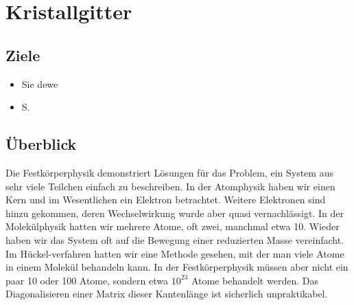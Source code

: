 
\chapter{Kristallgitter}





\section{Ziele}

\begin{itemize}
\item Sie dewe

\item S.

\end{itemize}





\section{Überblick}

Die Festkörperphysik demonstriert Lösungen für das Problem, ein System aus sehr viele Teilchen einfach zu beschreiben. In der Atomphysik haben wir einen Kern und im Wesentlichen ein Elektron betrachtet. Weitere Elektronen sind hinzu gekommen, deren Wechselwirkung wurde aber quasi vernachlässigt. In der Molekülphysik hatten wir mehrere Atome, oft zwei, manchmal etwa 10. Wieder haben wir das System oft auf die Bewegung einer reduzierten Masse vereinfacht. Im Hückel-verfahren hatten wir eine Methode gesehen, mit der man viele Atome in einem Molekül behandeln kann. In der Festkörperphysik müssen aber nicht ein paar 10 oder 100 Atome, sondern etwa $10^{23}$ Atome behandelt werden. Das Diagonalisieren einer Matrix dieser Kantenlänge ist sicherlich unpraktikabel.

